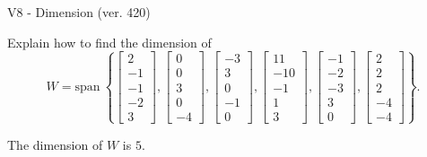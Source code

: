 \begin{exercise}
  \begin{exerciseTitle}V8 - Dimension (ver. 420)\end{exerciseTitle}
  \begin{exerciseStatement}
    Explain how to find the dimension of 
\[W=\mathrm{span}\ \left\{\left[\begin{array}{r}
2 \\
-1 \\
-1 \\
-2 \\
3
\end{array}\right] , \left[\begin{array}{r}
0 \\
0 \\
3 \\
0 \\
-4
\end{array}\right] , \left[\begin{array}{r}
-3 \\
3 \\
0 \\
-1 \\
0
\end{array}\right] , \left[\begin{array}{r}
11 \\
-10 \\
-1 \\
1 \\
3
\end{array}\right] , \left[\begin{array}{r}
-1 \\
-2 \\
-3 \\
3 \\
0
\end{array}\right] , \left[\begin{array}{r}
2 \\
2 \\
2 \\
-4 \\
-4
\end{array}\right]\right\}.\]



  \end{exerciseStatement}
  \begin{exerciseAnswer}
   The dimension of \(W\) is  \(5\).
  


  \end{exerciseAnswer}
\end{exercise}